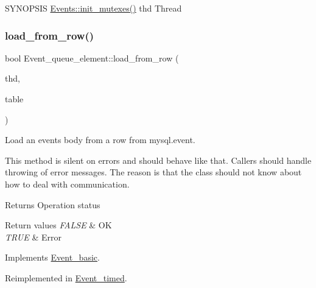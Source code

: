 S\+Y\+N\+O\+P\+S\+IS \mbox{\hyperlink{group__Event__Scheduler_gaa26988f7ec7f5d0053af28a5d8586236}{Events\+::init\+\_\+mutexes()}} thd Thread \mbox{\label{group__Event__Scheduler_ga2ac60939979bc9d825bbf5d77b3c3025}} 
\subsubsection{\texorpdfstring{load\+\_\+from\+\_\+row()}{load\_from\_row()}\hspace{0.1cm}{\footnotesize\ttfamily [1/3]}}
{\footnotesize\ttfamily bool Event\+\_\+queue\+\_\+element\+::load\+\_\+from\+\_\+row (\begin{DoxyParamCaption}\item[{T\+HD $\ast$}]{thd,  }\item[{\mbox{\hyperlink{structTABLE}{T\+A\+B\+LE}} $\ast$}]{table }\end{DoxyParamCaption})\hspace{0.3cm}{\ttfamily [virtual]}}

Load an event\textquotesingle{}s body from a row from mysql.\+event.

This method is silent on errors and should behave like that. Callers should handle throwing of error messages. The reason is that the class should not know about how to deal with communication.

\begin{DoxyReturn}{Returns}
Operation status 
\end{DoxyReturn}

\begin{DoxyRetVals}{Return values}
{\em F\+A\+L\+SE} & OK \\
\hline
{\em T\+R\+UE} & Error \\
\hline
\end{DoxyRetVals}


Implements \mbox{\hyperlink{classEvent__basic}{Event\+\_\+basic}}.



Reimplemented in \mbox{\hyperlink{group__Event__Scheduler_gaf182a3b09598193b22ee09f0661b4dc3}{Event\+\_\+timed}}.

\mbox{\label{group__Event__Scheduler_gaf182a3b09598193b22ee09f0661b4dc3}} 
